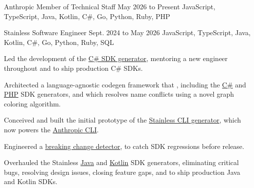 
\begin{cventry}
    {Anthropic}
    {Member of Technical Staff}
    {May 2026 to Present}
    {JavaScript, TypeScript, Java, Kotlin, C\#, Go, Python, Ruby, PHP}
    \vspace{-2mm}
\end{cventry}

\begin{cventry}
    {Stainless}
    {Software Engineer}
    {Sept. 2024 to May 2026}
    {JavaScript, TypeScript, Java, Kotlin, C\#, Go, Python, Ruby, SQL}
    \begin{cvitems}
        \item Led the development of the \href{https://www.stainless.com/docs/sdks/csharp}{C\# SDK generator}, mentoring a new engineer throughout and \href{https://github.com/anthropics/anthropic-sdk-csharp}{}\textm{, }\href{https://github.com/browserbase/stagehand-net}{}\href{https://github.com/search?q=%22%5B%5C%22X-Stainless-Lang%5C%22%5D+%3D+%5C%22csharp%5C%22%22&type=code}{\textm{10+ other companies}} to ship production C\# SDKs.
        \item Architected a language-agnostic codegen framework that , including the \href{https://www.stainless.com/docs/sdks/csharp}{C\#} and \href{https://www.stainless.com/docs/sdks/php}{PHP} SDK generators, and which resolves name conflicts using a novel graph coloring algorithm.
        \item Conceived and built the initial prototype of the \href{https://www.stainless.com/docs/cli}{Stainless CLI generator}, which now powers the \href{https://github.com/anthropics/anthropic-cli}{Anthropic CLI}.
        \item Engineered a \href{https://www.stainless.com/docs/enterprise/breaking-change-detection}{breaking change detector}, \href{https://github.com/anthropics}{}\textm{, }\href{https://github.com/cloudflare}{}\href{https://github.com/openai}{} to catch SDK regressions before release.
        \item Overhauled the Stainless \href{https://www.stainless.com/docs/sdks/java}{Java} and \href{https://www.stainless.com/docs/sdks/kotlin}{Kotlin} SDK generators, eliminating critical bugs, resolving design issues, closing feature gaps, and \href{https://github.com/anthropics/anthropic-sdk-java}{}\textm{, }\href{https://github.com/llamastack/llama-stack-client-kotlin}{}\textm{, }\href{https://github.com/openai/openai-java}{}\href{https://github.com/search?q=%2F%22X-Stainless-Lang%22%2C%20%22(java%7Ckotlin)%22%2F&type=code}{\textm{70+ other companies}} to ship production Java and Kotlin SDKs.
    \end{cvitems}
\end{cventry}

